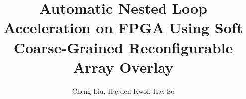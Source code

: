 \documentclass{acm_proc_article-sp}
\begin{document}
\title{Automatic Nested Loop Acceleration on FPGA Using Soft Coarse-Grained Reconfigurable
Array Overlay}

\author{
\alignauthor
Cheng Liu, Hayden Kwok-Hay So\\
       \\
       \\
   }
\maketitle


\begin{abstract}

\end{abstract}
 











\end{document}
